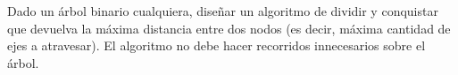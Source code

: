 
Dado un árbol binario cualquiera, diseñar un algoritmo de dividir y conquistar que devuelva la máxima distancia entre dos nodos (es decir, máxima cantidad de ejes a atravesar). El algoritmo no debe hacer recorridos innecesarios sobre el árbol.
